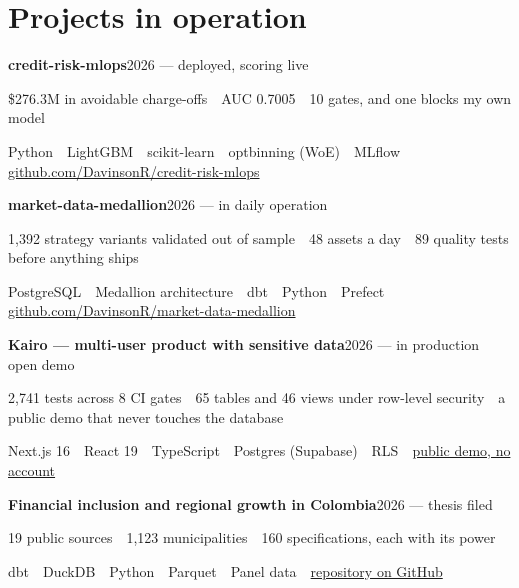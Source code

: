 \documentclass[a4paper,10pt]{article}
\newcommand{\row}[2]{\textbf{\color{ink}#1}\hfill{\small #2}\par}
\begin{document}
\section*{Projects in operation}
\row{credit-risk-mlops}{2026 --- deployed, scoring live}{\small\color{ink} \$276.3M in avoidable charge-offs \,\textperiodcentered\, AUC 0.7005 \,\textperiodcentered\, 10 gates, and one blocks my own model}\par{\small Python \,\textperiodcentered\, LightGBM \,\textperiodcentered\, scikit-learn \,\textperiodcentered\, optbinning (WoE) \,\textperiodcentered\, MLflow \,\textperiodcentered\, \href{https://github.com/DavinsonR/credit-risk-mlops}{github.com/DavinsonR/credit-risk-mlops}}\par
\vspace{1pt}
\row{market-data-medallion}{2026 --- in daily operation}{\small\color{ink} 1,392 strategy variants validated out of sample \,\textperiodcentered\, 48 assets a day \,\textperiodcentered\, 89 quality tests before anything ships}\par{\small PostgreSQL \,\textperiodcentered\, Medallion architecture \,\textperiodcentered\, dbt \,\textperiodcentered\, Python \,\textperiodcentered\, Prefect \,\textperiodcentered\, \href{https://github.com/DavinsonR/market-data-medallion}{github.com/DavinsonR/market-data-medallion}}\par
\vspace{1pt}
\row{Kairo --- multi-user product with sensitive data}{2026 --- in production \,\textperiodcentered\, open demo}{\small\color{ink} 2,741 tests across 8 CI gates \,\textperiodcentered\, 65 tables and 46 views under row-level security \,\textperiodcentered\, a public demo that never touches the database}\par{\small Next.js 16 \,\textperiodcentered\, React 19 \,\textperiodcentered\, TypeScript \,\textperiodcentered\, Postgres (Supabase) \,\textperiodcentered\, RLS \,\textperiodcentered\, \href{https://kairo.davirson.com/demo}{public demo, no account}}\par
\vspace{1pt}
\row{Financial inclusion and regional growth in Colombia}{2026 --- thesis filed}{\small\color{ink} 19 public sources \,\textperiodcentered\, 1,123 municipalities \,\textperiodcentered\, 160 specifications, each with its power}\par{\small dbt \,\textperiodcentered\, DuckDB \,\textperiodcentered\, Python \,\textperiodcentered\, Parquet \,\textperiodcentered\, Panel data \,\textperiodcentered\, \href{https://github.com/DavinsonR/financial-inclusion-colombia}{repository on GitHub}}\par
\vspace{1pt}
\end{document}
